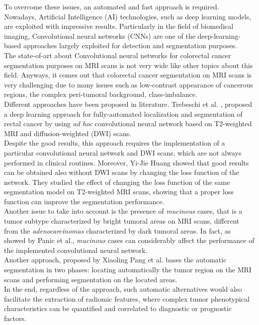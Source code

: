 \documentclass{standalone}
\begin{document}
To overcome these issues, an automated and fast approach is required.
\\
Nowadays, Artificial Intelligence (AI) technologies, such as deep learning models, are exploited with impressive results.
Particularly in the field of biomedical imaging, Convolutional neural networks (CNNs) are one of the deep-learning-based approaches largely exploited for detection and segmentation purposes\cite{Trebeschi2017}.
\\
The state-of-art about Convolutional neural networks for colorectal cancer segmentation purposes on MRI scans is not very wide like other topics about this field.
Anyways, it comes out that colorectal cancer segmentation on MRI scans is very challenging due to many issues such as low-contrast appearance of cancerous regions, the complex peri-tumoral background, class-imbalance\cite{YiJieHuang}.
\\
Different approaches have been proposed in literature.
Trebeschi et al. \cite{Trebeschi2017}, proposed a deep learning approach for fully-automated localization and segmentation of rectal cancer by using \textit{ad hoc} convolutional neural network based on T2-weighted MRI and diffusion-weighted (DWI) scans. 
\\
Despite the good results, this approach requires the implementation of a particular convolutional neural network and DWI scans, which are not always performed in clinical routines.
Moreover, Yi-Jie Huang\cite{YiJieHuang} showed that good results can be obtained also without DWI scans by changing the loss function of the network.
They studied the effect of changing the loss function of the same segmentation model on T2-weighted MRI scans, showing that a proper loss function can improve the segmentation performance.
\\
Another issue to take into account is the presence of \textit{mucinous} cases, that is a tumor subtype characterized by bright tumoral areas on MRI scans, different from the \textit{adenocarcinomas} characterized by dark tumoral areas.
In fact, as showed by Panic et al.\cite{jpanic}, \textit{mucinous} cases can considerably affect the performance of the implemented convolutional neural network.
\\
Another approach, proposed by Xiaoling Pang et al.\cite{XiaolingPang} bases the automatic segmentation in two phases: locating automatically the tumor region on the MRI scans and performing segmentation on the located areas.
\\
In the end, regardless of the approach, such automatic alternatives would also facilitate the extraction of radiomic features, where complex tumor phenotypical characteristics can be quantified and correlated to diagnostic or prognostic factors\cite{Trebeschi2017}.
\end{document}

